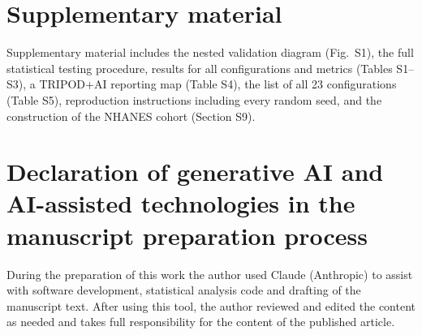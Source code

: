 \documentclass[preprint,12pt,authoryear=false]{elsarticle}
\begin{document}
\section*{Supplementary material}
Supplementary material includes the nested validation diagram (Fig.~S1), the full statistical testing procedure, results for all configurations and metrics (Tables S1--S3), a TRIPOD+AI reporting map (Table S4), the list of all 23 configurations (Table S5), reproduction instructions including every random seed, and the construction of the NHANES cohort (Section S9).

\section*{Declaration of generative AI and AI-assisted technologies in the manuscript preparation process}
During the preparation of this work the author used Claude (Anthropic) to assist with software development, statistical analysis code and drafting of the manuscript text. After using this tool, the author reviewed and edited the content as needed and takes full responsibility for the content of the published article.



\end{document}
